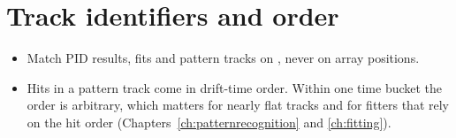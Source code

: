 \section{Track identifiers and order}

\begin{itemize}
\item Match PID results, fits and pattern tracks on , never on array positions.
\item Hits in a pattern track come in drift-time order. Within one time bucket the order is arbitrary, which
  matters for nearly flat tracks and for fitters that rely on the hit order
  (Chapters~\ref{ch:patternrecognition} and \ref{ch:fitting}).
\end{itemize}
